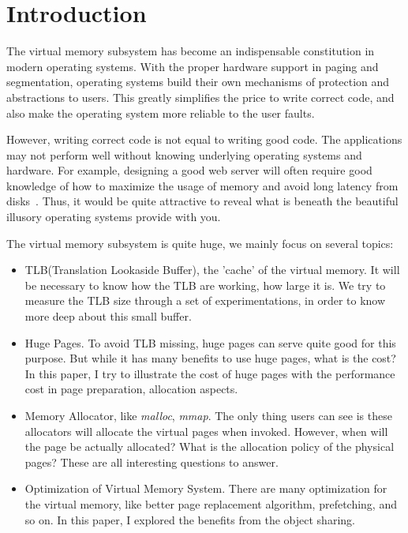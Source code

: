 \section{Introduction}
    \label{sec:intro}
	
The virtual memory subsystem has become an indispensable constitution in modern
operating systems. With the proper hardware support in paging and segmentation,
operating systems build their own mechanisms of protection and abstractions to
users. This greatly simplifies the price to write correct code, and also make
the operating system more reliable to the user faults.

However, writing correct code is not equal to writing good code. The
applications may not perform well without knowing underlying operating systems
and hardware. For example, designing a good web server will often require good
knowledge of how to maximize the usage of memory and avoid long latency from
disks~\cite{c10k}. Thus, it would be quite attractive to reveal what is beneath
the beautiful illusory operating systems provide with you.

The virtual memory subsystem is quite huge, we mainly focus on several topics:
\begin{itemize}
\item TLB(Translation Lookaside Buffer), the 'cache' of the virtual memory. It
will be necessary to know how the TLB are working, how large it is. We try to
measure the TLB size through a set of experimentations, in order to know more
deep about this small buffer.
\item Huge Pages. To avoid TLB missing, huge pages can serve quite good for
this purpose. But while it has many benefits to use huge pages, what is the
cost? In this paper, I try to illustrate the cost of huge pages with the 
performance cost in page preparation, allocation aspects.
\item Memory Allocator, like \emph{malloc}, \emph{mmap}. The only thing users
can see is these allocators will allocate the virtual pages when invoked. However,
when will the page be actually allocated? What is the allocation policy of the
physical pages? These are all interesting questions to answer.
\item Optimization of Virtual Memory System. There are many optimization for the 
virtual memory, like better page replacement algorithm, prefetching, and so on. In
this paper, I explored the benefits from the object sharing.
\end{itemize}

